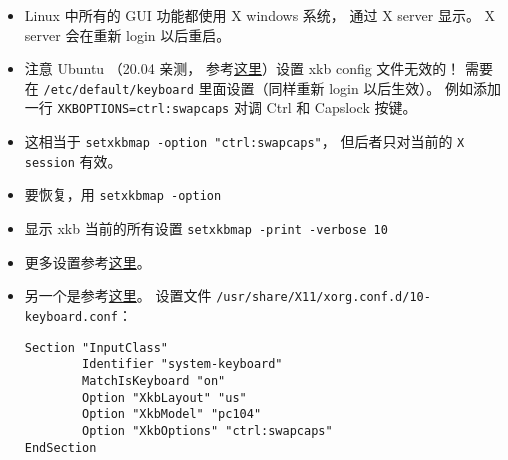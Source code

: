 
\begin{issues}
\issueDraft
\end{issues}

\begin{itemize}
\item Linux 中所有的 GUI 功能都使用 X windows 系统， 通过 X server 显示。 X server 会在重新 login 以后重启。
\item 注意 Ubuntu （20.04 亲测， 参考\href{https://manpages.ubuntu.com/manpages/focal/en/man5/keyboard.5.html}{这里}）设置 xkb config 文件无效的！ 需要在 \verb|/etc/default/keyboard| 里面设置（同样重新 login 以后生效）。 例如添加一行 \verb|XKBOPTIONS=ctrl:swapcaps| 对调 Ctrl 和 Capslock 按键。
\item 这相当于 \verb|setxkbmap -option "ctrl:swapcaps"|， 但后者只对当前的 \verb|X session| 有效。
\item 要恢复，用 \verb|setxkbmap -option|
\item 显示 xkb 当前的所有设置 \verb|setxkbmap -print -verbose 10|
\item 更多设置参考\href{https://gist.github.com/jatcwang/ae3b7019f219b8cdc6798329108c9aee}{这里}。
\item 另一个是参考\href{https://www.linux.com/training-tutorials/hacking-your-linux-keyboard-xkb/}{这里}。 设置文件 \verb`/usr/share/X11/xorg.conf.d/10-keyboard.conf`：
\begin{lstlisting}[language=none]
Section "InputClass"
        Identifier "system-keyboard"
        MatchIsKeyboard "on"
        Option "XkbLayout" "us"
        Option "XkbModel" "pc104"
        Option "XkbOptions" "ctrl:swapcaps"
EndSection
\end{lstlisting}
\end{itemize}
